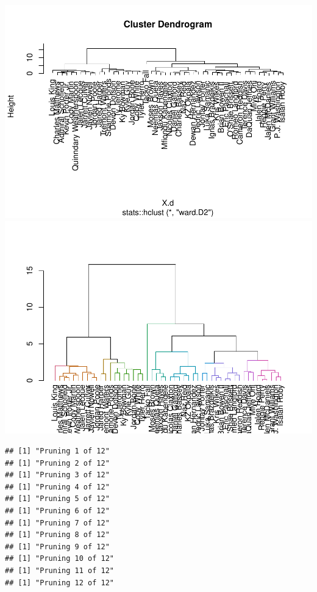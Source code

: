 \documentclass[]{article}
\begin{document}
\includegraphics{project-measure-writeup_files/figure-latex/hclust-nbarookies-1.pdf}
\includegraphics{project-measure-writeup_files/figure-latex/hclust-nbarookies-2.pdf}

\begin{verbatim}
## [1] "Pruning 1 of 12"
## [1] "Pruning 2 of 12"
## [1] "Pruning 3 of 12"
## [1] "Pruning 4 of 12"
## [1] "Pruning 5 of 12"
## [1] "Pruning 6 of 12"
## [1] "Pruning 7 of 12"
## [1] "Pruning 8 of 12"
## [1] "Pruning 9 of 12"
## [1] "Pruning 10 of 12"
## [1] "Pruning 11 of 12"
## [1] "Pruning 12 of 12"
\end{verbatim}
\end{document}
